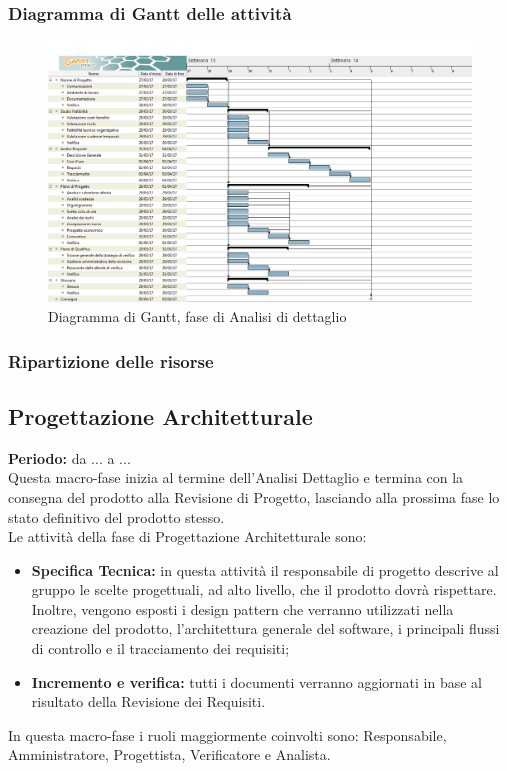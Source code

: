 	\subsubsection{Diagramma di Gantt delle attività}
	\begin{figure}[H]
		\centering
		\includegraphics[scale=0.30]{immagini/gantt/analisi_dettaglio.png}
		\caption{Diagramma di Gantt, fase di Analisi di dettaglio}
	\end{figure}
	\subsubsection{Ripartizione delle risorse}
	\subsection{Progettazione Architetturale}
	\textbf{Periodo:} da ... a ... \\
	Questa macro-fase inizia al termine dell'Analisi Dettaglio e termina con la consegna del prodotto alla Revisione di Progetto, lasciando alla prossima fase lo stato definitivo del prodotto stesso. \\
	Le attività della fase di Progettazione Architetturale sono: \\
	\begin{itemize}
		\item \textbf{Specifica Tecnica:} in questa attività il responsabile di progetto descrive al gruppo le scelte progettuali, ad alto livello, che il prodotto dovrà rispettare. Inoltre, vengono esposti i design pattern che verranno utilizzati nella creazione del prodotto, l'architettura generale del software, i principali flussi di controllo e il tracciamento dei requisiti; \\
		\item \textbf{Incremento e verifica:} tutti i documenti verranno aggiornati in base al risultato
della Revisione dei Requisiti. \\
	\end{itemize}
	In questa macro-fase i ruoli maggiormente coinvolti sono: Responsabile, Amministratore, Progettista, Verificatore e Analista.
